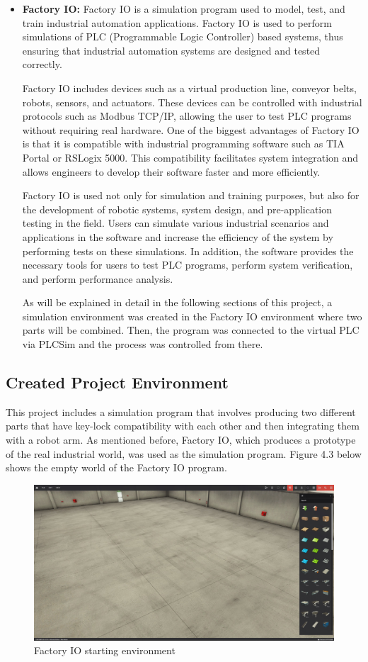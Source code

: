 \begin{itemize}
    \item \textbf{Factory IO:} Factory IO is a simulation program used to model, test, and train industrial automation applications. Factory IO is used to perform simulations of PLC (Programmable Logic Controller) based systems, thus ensuring that industrial automation systems are designed and tested correctly.

    Factory IO includes devices such as a virtual production line, conveyor belts, robots, sensors, and actuators. These devices can be controlled with industrial protocols such as Modbus TCP/IP, allowing the user to test PLC programs without requiring real hardware. One of the biggest advantages of Factory IO is that it is compatible with industrial programming software such as TIA Portal or RSLogix 5000. This compatibility facilitates system integration and allows engineers to develop their software faster and more efficiently.

    Factory IO is used not only for simulation and training purposes, but also for the development of robotic systems, system design, and pre-application testing in the field. Users can simulate various industrial scenarios and applications in the software and increase the efficiency of the system by performing tests on these simulations. In addition, the software provides the necessary tools for users to test PLC programs, perform system verification, and perform performance analysis.
    
    As will be explained in detail in the following sections of this project, a simulation environment was created in the Factory IO environment where two parts will be combined. Then, the program was connected to the virtual PLC via PLCSim and the process was controlled from there.
\end{itemize}

\subsection{Created Project Environment}
This project includes a simulation program that involves producing two different parts that have key-lock compatibility with each other and then integrating them with a robot arm. As mentioned before, Factory IO, which produces a prototype of the real industrial world, was used as the simulation program. Figure 4.3 below shows the empty world of the Factory IO program.

\begin{figure}[H]
    \centering
    \includegraphics[width=0.5\columnwidth]{FactoryIO_baslangic_ortami.jpg}
    \caption[Factory IO starting environment]{Factory IO starting environment}
    \label{fig-magnitude}
\end{figure}%

